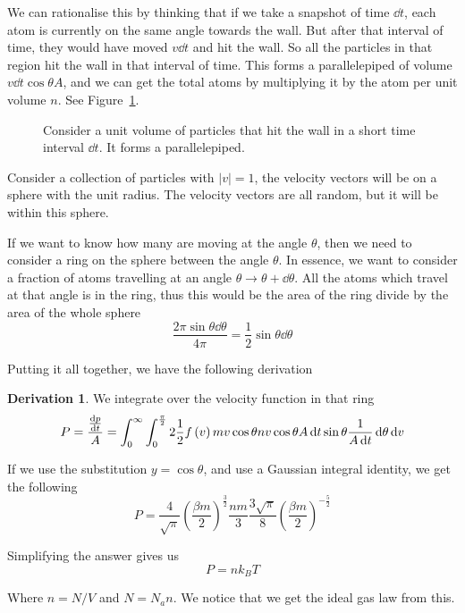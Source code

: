 \documentclass[12pt,chapterprefix=false,dvipsnames]{scrbook}
\theoremstyle{dotless}
\theoremstyle{definition}
\newtheorem{protoderivation}{Derivation}[section]
\newenvironment{derivation}
{\colorlet{shadecolor}{purple!15}\begin{shaded}\begin{protoderivation}}
			{\end{protoderivation}\end{shaded}}
\begin{document}
We can rationalise this by thinking that if we take a snapshot
of time $\dd{t}$, each atom is currently on the
same angle towards the wall. But after that interval of time,
they would have moved $v\dd{t}$ and hit the wall.
So all the particles in that region hit the wall in that
interval of time. This forms a parallelepiped of volume
$v\dd{t}\cos{\theta}A$, and we can get the total atoms by
multiplying it by the atom per unit volume
$n$. See Figure~\ref{fig:pressure_distribution}.

\begin{figure}[htpb]
	\centering
	
	\caption{Consider a unit volume of particles that hit the wall in a short
		time interval $\dd{t}$. It forms a parallelepiped.}%
	\label{fig:pressure_distribution}
\end{figure}

Consider a collection of particles with $\left|v\right| = 1$,
the velocity vectors will be on a sphere with the unit radius.
The velocity vectors are all random, but it will be within this
sphere.

If we want to know how many are moving at the angle
$\theta$, then we need to consider a ring on the
sphere between the angle $\theta$. In essence, we
want to consider a fraction of atoms travelling at an angle
$\theta \rightarrow \theta +\dd{\theta}$. All the atoms which travel at that
angle is in the ring, thus this would be the area of the ring
divide by the area of the whole sphere
\begin{equation}
	\frac{2\pi\sin{\theta}\dd{\theta}}{4\pi}
	=
	\frac{1}{2}\sin{\theta}\dd{\theta}
\end{equation}

Putting it all together, we have the following derivation

\begin{derivation}
	We integrate over the velocity function in that ring
	\begin{equation}
		P = \frac{\dv{p}{t}}{A} =
		\int_0^\infty\int_0^{\frac{\pi}{2}}2\frac{1}{2}
		f\left(v\right) mv\cos{\theta}
		nv\cos{\theta} A
		\dd{t}\sin{\theta}
		\frac{1}{A \dd{t}}
		\dd{\theta}\dd{v}
	\end{equation}

	If we use the substitution $y = \cos{\theta}$, and use a
	Gaussian integral identity, we get the following
	\begin{equation}
		P = \frac{4}{\sqrt{\pi}} {\left(\frac{\beta m}{2}\right)}^{\frac{3}{2}} \frac{nm}{3}
		\frac{3\sqrt{\pi}}{8} {\left(\frac{\beta m}{2}\right)}^{-\frac{5}{2}}
	\end{equation}

	Simplifying the answer gives us
	\begin{equation}
		P = nk_B T
	\end{equation}

	Where $n = N/V$ and $N = N_a n$. We
	notice that we get the ideal gas law from this.
\end{derivation}
\end{document}

